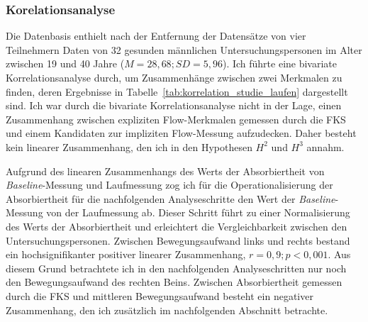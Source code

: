 \subsubsection{Korelationsanalyse}
Die Datenbasis enthielt nach der Entfernung der Datensätze von vier Teilnehmern Daten von 32 gesunden männlichen Untersuchungspersonen im Alter zwischen 19 und 40 Jahre ($M = 28{,}68; SD = 5{,}96$). Ich führte eine bivariate Korrelationsanalyse durch, um Zusammenhänge zwischen zwei Merkmalen zu finden, deren Ergebnisse in Tabelle~\ref{tab:korrelation_studie_laufen} dargestellt sind. Ich war durch die bivariate Korrelationsanalyse nicht in der Lage, einen Zusammenhang zwischen expliziten Flow-Merkmalen gemessen durch die \ac{FKS} und einem Kandidaten zur impliziten Flow-Messung aufzudecken. Daher besteht kein linearer Zusammenhang, den ich in den Hypothesen $H^2$ und $H^3$ annahm.

Aufgrund des linearen Zusammenhangs des Werts der Absorbiertheit von \emph{Baseline}-Messung und Laufmessung zog ich für die Operationalisierung der Absorbiertheit für die nachfolgenden Analyseschritte den Wert der \emph{Baseline}-Messung von der Laufmessung ab. Dieser Schritt führt zu einer Normalisierung des Werts der Absorbiertheit und erleichtert die Vergleichbarkeit zwischen den Untersuchungspersonen. Zwischen Bewegungsaufwand links und rechts bestand ein hochsignifikanter positiver linearer Zusammenhang, $r = 0{,}9; p < 0{,}001$. Aus diesem Grund betrachtete ich in den nachfolgenden Analyseschritten nur noch den Bewegungsaufwand des rechten Beins. Zwischen Absorbiertheit gemessen durch die \ac{FKS} und mittleren Bewegungsaufwand besteht ein negativer Zusammenhang, den ich zusätzlich im nachfolgenden Abschnitt betrachte.

